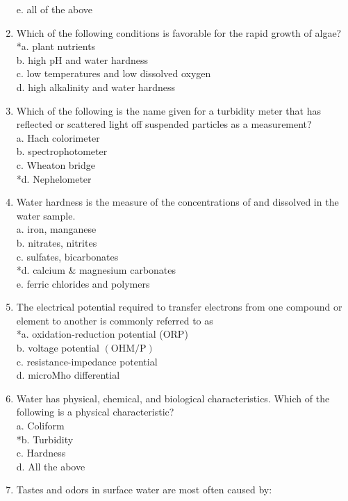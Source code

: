 \begin{enumerate}[1.]
e. all of the above\\
\item Which of the following conditions is favorable for the rapid growth of algae?\\
*a. plant nutrients\\
b. high pH and water hardness\\
c. low temperatures and low dissolved oxygen\\
d. high alkalinity and water hardness\\
\item Which of the following is the name given for a turbidity meter that has reflected or scattered light off suspended particles as a measurement?\\
a. Hach colorimeter\\
b. spectrophotometer\\
c. Wheaton bridge\\
*d. Nephelometer\\
\item Water hardness is the measure of the concentrations of and dissolved in the water sample.\\
a. iron, manganese\\
b. nitrates, nitrites\\
c. sulfates, bicarbonates\\
*d. calcium \& magnesium carbonates\\
e. ferric chlorides and polymers\\
\item The electrical potential required to transfer electrons from one compound or element to another is commonly referred to as\\
*a. oxidation-reduction potential (ORP)\\
b. voltage potential $(\mathrm{OHM} / \mathrm{P})$\\
c. resistance-impedance potential\\
d. microMho differential\\
\item Water has physical, chemical, and biological characteristics. Which of the following is a physical characteristic?\\
a. Coliform\\
*b. Turbidity\\ 
c. Hardness\\
d. All the above\\
\item Tastes and odors in surface water are most often caused by:\\

\end{enumerate}
